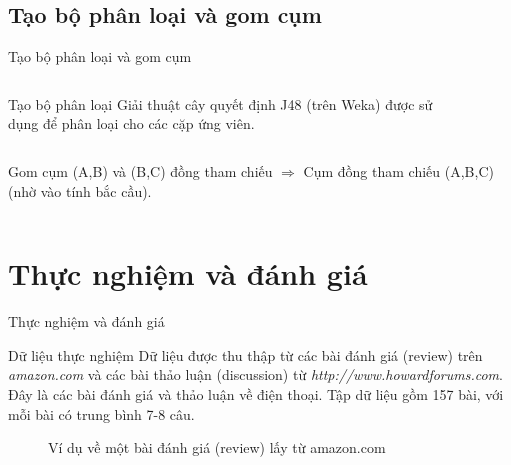 \documentclass[9pt,xcolor=table,hyperref=unicode]{beamer}
\begin{document}
	\subsection{Tạo bộ phân loại và gom cụm}
	\begin{frame}{Tạo bộ phân loại và gom cụm}		
		\begin{columns}[t]
			\begin{column}{0.4\textwidth}
			   	\begin{block}{Tạo bộ phân loại}
					Giải thuật cây quyết định J48 (trên Weka) được sử dụng để phân loại cho các cặp ứng viên.
				\end{block}				
			\end{column}
			\begin{column}{0.6\textwidth}  %
			 	\begin{figure}[H]
					\LARGE 
					\centering				
					\resizebox{65mm}{!}{}	
				\end{figure}
			\end{column}
		\end{columns}
		\begin{columns}[t]
			\begin{column}{\textwidth}
			   	\begin{block}{Gom cụm}
			   		(A,B) và (B,C) đồng tham chiếu $\Rightarrow$ Cụm đồng tham chiếu (A,B,C) (nhờ vào tính bắc cầu).
				\end{block}					
			\end{column}			
		\end{columns}
	\end{frame}

	\section{Thực nghiệm và đánh giá}				
		\begin{frame}{Thực nghiệm và đánh giá}			
			\begin{block}{Dữ liệu thực nghiệm}
				Dữ liệu được thu thập từ các bài đánh giá (review) trên \textit{amazon.com} và các bài thảo luận (discussion) từ \textit{http://www.howardforums.com}. Đây là các bài đánh giá và thảo luận về điện thoại. Tập dữ liệu gồm 157 bài, với mỗi bài có trung bình 7-8 câu.
			\end{block}
			\begin{figure}[H]
				\centering				
				\noindent{}
				\caption{Ví dụ về một bài đánh giá (review) lấy từ amazon.com}				
			\end{figure}
		\end{frame}		
\end{document}
